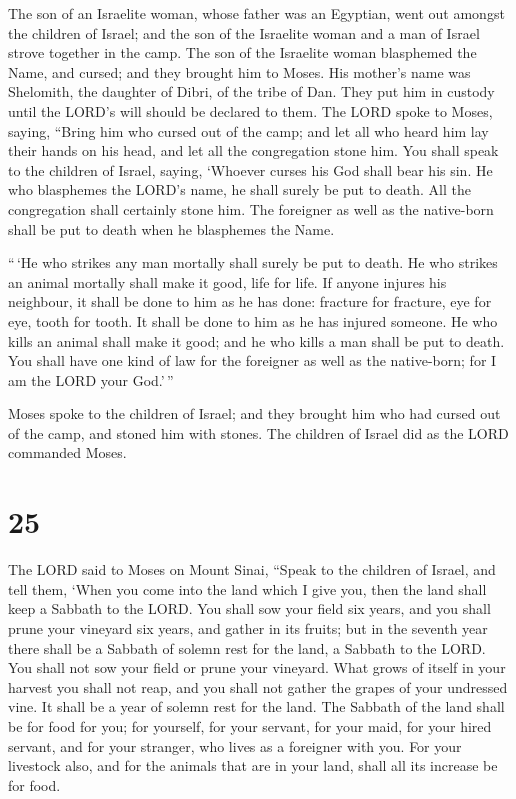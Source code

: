  The son of an Israelite woman, whose father was an
Egyptian, went out amongst the children of Israel; and the son of the
Israelite woman and a man of Israel strove together in the camp.
 The son of the Israelite woman blasphemed the Name, and
cursed; and they brought him to Moses. His mother's name was Shelomith,
the daughter of Dibri, of the tribe of Dan.  They put him
in custody until the LORD's will should be declared to them.
 The LORD spoke to Moses, saying,  ``Bring him
who cursed out of the camp; and let all who heard him lay their hands on
his head, and let all the congregation stone him.  You
shall speak to the children of Israel, saying, `Whoever curses his God
shall bear his sin.  He who blasphemes the LORD's name, he
shall surely be put to death. All the congregation shall certainly stone
him. The foreigner as well as the native-born shall be put to death when
he blasphemes the Name.

 ``\,`He who strikes any man mortally shall surely be put
to death.  He who strikes an animal mortally shall make it
good, life for life.  If anyone injures his neighbour, it
shall be done to him as he has done:  fracture for
fracture, eye for eye, tooth for tooth. It shall be done to him as he
has injured someone.  He who kills an animal shall make it
good; and he who kills a man shall be put to death.  You
shall have one kind of law for the foreigner as well as the native-born;
for I am the LORD your God.'\,''

 Moses spoke to the children of Israel; and they brought
him who had cursed out of the camp, and stoned him with stones. The
children of Israel did as the LORD commanded Moses.

\hypertarget{section-24}{%
\section{25}\label{section-24}}

 The LORD said to Moses on Mount Sinai,  ``Speak
to the children of Israel, and tell them, `When you come into the land
which I give you, then the land shall keep a Sabbath to the LORD.
 You shall sow your field six years, and you shall prune
your vineyard six years, and gather in its fruits;  but in
the seventh year there shall be a Sabbath of solemn rest for the land, a
Sabbath to the LORD. You shall not sow your field or prune your
vineyard.  What grows of itself in your harvest you shall
not reap, and you shall not gather the grapes of your undressed vine. It
shall be a year of solemn rest for the land.  The Sabbath of
the land shall be for food for you; for yourself, for your servant, for
your maid, for your hired servant, and for your stranger, who lives as a
foreigner with you.  For your livestock also, and for the
animals that are in your land, shall all its increase be for food.

